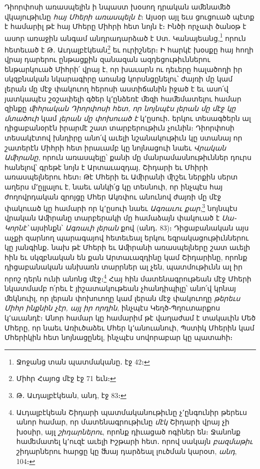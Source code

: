 \documentclass{article}
\begin{document}
{Դիորփոսի առասպելին ի նպաստ խօսող դրական աﬔնաﬔծ վկայութիւնը \emph{հայ Մհերի առասպելն է}։ Այսօր այլ եւս ցուցուած պէտք է համարիլ թէ հայ Մհերը Միհրի հետ նոյն է։ Ինծի որչափ ծանօթ է ասոր առաջին անգամ անդրադարձած է Ստ․ Կանայեանց,\footnote{Ջոջանց տան պատմականը․ էջ 42։} որուն հետեւած է Թ․ Աւդալբէկեան\footnote{Միհր Հայոց մէջ էջ 71 եւն։} եւ ուրիշներ։ Ի հարկէ խօսքը հայ հողի վրայ դարերու ընթացքին զանազան ազդեցութիւններու ենթարկուած Միհրի՛ վրայ է, որ խաւարն ու դեւերը հալածողի իր սկզբնական նկարագիրը առանց կորսնցընելու՝ ժայռի մը կամ լերան մը մէջ փակուող հերոսի աստիճանին իջած է եւ ասո՛վ յատկապէս շօշափելի գծեր կ՚ընձեռէ ﬔզի հաﬔմատելու համար զինքը \emph{ﬕհրական Դիորփոսի հետ, որ նոյնպէս լերան մը մէջ կը մտածուի} կամ \emph{լերան մը փոխուած է} կ՚ըսուի․ երկու տեսագծերն ալ դիցաբանօրէն իրարմէ շատ տարբերութիւն չունին։ Դիորփոսի տեսակէտով խնդիրը անո՛վ աւելի նշանակութիւն կը ստանայ որ շատերէն Միհրի հետ իրաւամբ կը նոյնացուի նաեւ \emph{Վրական Աﬕրանը}, որուն առասպելը՝ քանի մը մանրամասնութիւններ դուրս հանելով՝ գրեթէ նոյն է Արտաւազդայ, Շիդարի եւ Մհիրի առասպելներու հետ։ Թէ Մհերի եւ Աﬕրանի ﬕշեւ ներքին սերտ աղերս մ՚ըլլալու է, նաեւ անկի՛ց կը տեսնուի, որ ինչպէս հայ ժողովրդական զրոյցը Մհեր Ակռփու անունով ժայռի մը մէջ փակուած կը համարի որ կ՚ըսուի նաեւ \emph{Ագռաւու քար},\footnote{Թ․ Աւդալբէկեան, անդ, էջ 83։} նոյնպէս վրական Աﬕրանը տարբերակի մը համաձայն փակուած է \emph{Սա֊Կորնէ՝} այսինքն՝ \emph{Ագռաւի լերան} քով (անդ․ 83)։ Դիցաբանական այս աչքի զարնող պարագայով հետեւեալ երկու եզրակացութիւններու կը յանգինք․ նախ թէ Մհերի եւ Աﬕրանի առասպելները շատ աւելի հին եւ սկզբնական են քան Արտաւազդինը կամ Շիդարինը, որոնք դիցաբանական անխառն տարրներ ալ չեն, պատմութիւնն ալ իր որոշ դերն ունի անոնց մէջ։\footnote{Աւդալբէկեան Շիդարի պատմականութիւնը չ՚ընգունիր թերեւս անոր համար, որ մատենագրութիւնը \emph{մէկ} Շիդարի վրայ չի խօսիր, այլ \emph{շիդարներու}, որոնք դիւացած ոգիներ են։ Ջանոնք հաﬔմատել կ՚ուզէ աւելի Իշթարի հետ․ որով սակայն \emph{բազմաթիւ} շիդարներու հարցը կը ﬓայ դարձեալ լուծման կարօտ, \emph{անդ}, 104։} Հայ հին մատենագրութեան մէջ Մհերի նկատմամբ ո՛րեւ է յիշատակութեան չհանդիպիլը՝ անո՛վ կրնայ ﬔկնուիլ, որ լերան փոխուողը կամ լերան մէջ փակուողը \emph{թերեւս Միհր ինքնին չէր, այլ իր որդին}, ինչպէս Կեղծ֊Պղուտարքոս կ՚աւանդէ։ Անոր համար կը համարիմ թէ վաղաժամ է տակաւին Մեծ Մհերը, որ նաեւ Առիւծաձեւ Մհեր կ՚անուանուի, Պստիկ Մհերին կամ Մհերիկին հետ նոյնացընել, ինչպէս սովորաբար կը պատահի։

}
\end{document}

